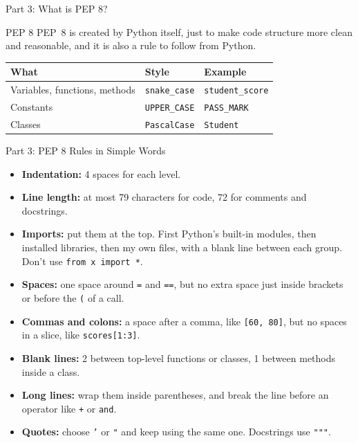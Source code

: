 \documentclass[aspectratio=169,11pt]{beamer}
\begin{document}
\begin{frame}{Part 3: What is PEP 8?}
  \begin{block}{PEP 8}
    PEP~8 is created by Python itself, just to make code structure more clean and
    reasonable, and it is also a rule to follow from Python.
  \end{block}
  \vspace{6pt}
  \centering
  \begin{tabular}{@{}lll@{}}
    \toprule
    \textbf{What} & \textbf{Style} & \textbf{Example} \\
    \midrule
    Variables, functions, methods & \texttt{snake\_case} & \texttt{student\_score} \\
    Constants & \texttt{UPPER\_CASE} & \texttt{PASS\_MARK} \\
    Classes & \texttt{PascalCase} & \texttt{Student} \\
    \bottomrule
  \end{tabular}
\end{frame}

\begin{frame}{Part 3: PEP 8 Rules in Simple Words}
  \small
  \begin{itemize}\setlength\itemsep{3pt}
    \item \textbf{Indentation:} 4 spaces for each level.
    \item \textbf{Line length:} at most 79 characters for code, 72 for comments
      and docstrings.
    \item \textbf{Imports:} put them at the top. First Python's built-in modules,
      then installed libraries, then my own files, with a blank line between each
      group. Don't use \texttt{from x import *}.
    \item \textbf{Spaces:} one space around \texttt{=} and \texttt{==}, but no
      extra space just inside brackets or before the \texttt{(} of a call.
    \item \textbf{Commas and colons:} a space after a comma, like
      \texttt{[60, 80]}, but no spaces in a slice, like \texttt{scores[1:3]}.
    \item \textbf{Blank lines:} 2 between top-level functions or classes, 1
      between methods inside a class.
    \item \textbf{Long lines:} wrap them inside parentheses, and break the line
      before an operator like \texttt{+} or \texttt{and}.
    \item \textbf{Quotes:} choose \texttt{'} or \texttt{"} and keep using the same
      one. Docstrings use \texttt{"""}.
  \end{itemize}
\end{frame}
\end{document}
